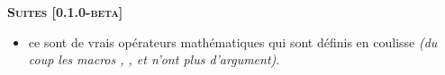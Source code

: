 \separation




\begin{center}
    \textbf{\textsc{Suites [0.1.0-beta]}}
\end{center}

\begin{itemize}[itemsep=.5em]
    \item {}
          ce sont de vrais opérateurs mathématiques qui sont définis en coulisse \emph{(du coup les macros , ,  et  n'ont plus d'argument)}.   
\end{itemize}


\separation
